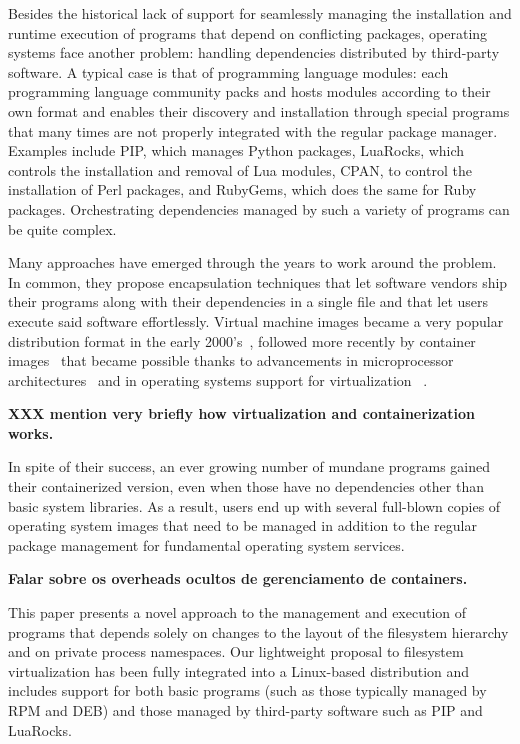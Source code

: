 \documentclass[sigplan, anonymous, 10pt]{acmart}
\begin{document}
Besides the historical lack of support for seamlessly managing the installation and runtime
execution of programs that depend on conflicting packages, operating systems face another problem:
handling dependencies distributed by third-party software. A typical case is that of programming
language modules: each programming language community packs and hosts modules according to their own
format and enables their discovery and installation through special programs that many times are not
properly integrated with the regular package manager. Examples include PIP, which manages Python
packages, LuaRocks, which controls the installation and removal of Lua modules, CPAN, to control the
installation of Perl packages, and RubyGems, which does the same for Ruby packages. Orchestrating
dependencies managed by such a variety of programs can be quite complex.

Many approaches have emerged through the years to work around the problem. In common, they propose
encapsulation techniques that let software vendors ship their programs along with their dependencies
in a single file and that let users execute said software effortlessly. Virtual machine images
became a very popular distribution format in the early 2000's~\cite{Who?}, followed more recently by
container images~\cite{fink2014:docker} that became possible thanks to advancements in microprocessor
architectures~\cite{uhlig2005:vtx, amd2005:svm} and in operating systems support for virtualization
~\cite{russell2008:virtio, dall2014:kvm+arm, kivity2007:kvm}. 

\textbf{XXX mention very briefly how virtualization and containerization works.}
\lipsum[1]

In spite
of their success, an ever growing number of mundane programs gained their containerized version,
even when those have no dependencies other than basic system libraries. As a result, users end up
with several full-blown copies of operating system images that need to be managed in addition to
the regular package management for fundamental operating system services.

\textbf{Falar sobre os overheads ocultos de gerenciamento de containers.}

This paper presents a novel approach to the management and execution of programs that depends
solely on changes to the layout of the filesystem hierarchy and on private process namespaces.
Our lightweight proposal to filesystem virtualization has been fully integrated into a Linux-based
distribution and includes support for both basic programs (such as those typically managed by RPM
and DEB) and those managed by third-party software such as PIP and LuaRocks.
\end{document}
